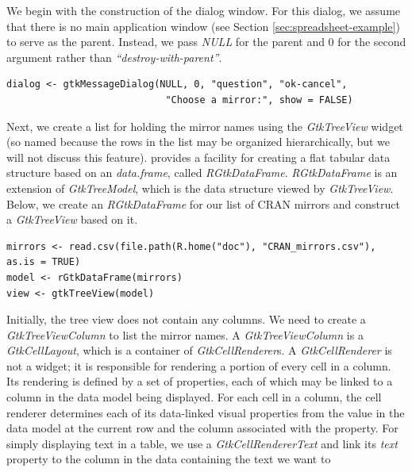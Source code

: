 \documentclass[article]{jss}
\begin{document}
We begin with the construction of the dialog window. For this dialog,
we 
assume that there is no main application window (see Section
\ref{sec:spreadsheet-example}) to serve as the
parent. 
Instead, we pass \emph{NULL} for the parent and $0$ for the second
argument 
rather than \emph{``destroy-with-parent''}.
\begin{verbatim}
dialog <- gtkMessageDialog(NULL, 0, "question", "ok-cancel", 
                            "Choose a mirror:", show = FALSE)
\end{verbatim}
Next, we create a list for holding the mirror names using the
\emph{GtkTreeView}
widget (so named because the rows in the list may be organized hierarchically, but we will not discuss this feature).  
provides a 
facility for creating a flat tabular data structure based on an
\emph{data.frame}, called \emph{RGtkDataFrame}. \emph{RGtkDataFrame}
is
an extension of \emph{GtkTreeModel}, which is the data structure
viewed by
\emph{GtkTreeView}. Below, we create an \emph{RGtkDataFrame} for our
list
of CRAN mirrors and construct a \emph{GtkTreeView} based on it.
\begin{verbatim}
mirrors <- read.csv(file.path(R.home("doc"), "CRAN_mirrors.csv"),
as.is = TRUE)
model <- rGtkDataFrame(mirrors)
view <- gtkTreeView(model)
\end{verbatim}
Initially, the tree view does not contain any columns. We need to
create a \emph{GtkTreeViewColumn} to list the mirror names. A
\emph{GtkTreeViewColumn}
is a \emph{GtkCellLayout}, which is a container of
\emph{GtkCellRenderer}s. 
A \emph{GtkCellRenderer} is not a widget; it is responsible for
rendering
a portion of every cell in a column. Its rendering is defined by a set
of
properties, each of which may be linked to a column in the data model
being displayed. For each
cell in a column, the cell renderer determines each of its data-linked
visual
properties from the value in the data model at the current
row and the column associated with the property. For simply displaying
text in a table, we use a \emph{GtkCellRendererText} and link its
\emph{text}
property to the column in the data containing the text we want to
\end{document}

